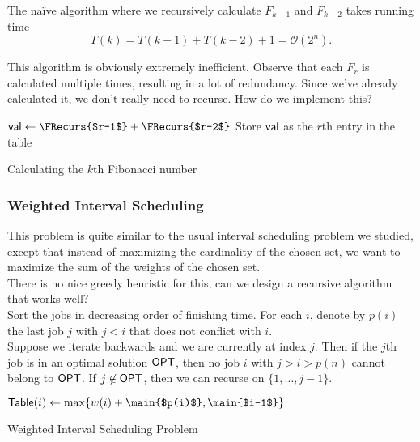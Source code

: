The na\"ive algorithm where we recursively calculate $F_{k-1}$ and $F_{k-2}$ takes running time
\[ T(k) = T(k-1) + T(k-2) + 1 = \mathcal{O}(2^n). \]

This algorithm is obviously extremely inefficient. Observe that each $F_r$ is calculated multiple times, resulting in a lot of redundancy. Since we've already calculated it, we don't really need to recurse. How do we implement this?

\begin{algorithm}[H]
	\DontPrintSemicolon
	 {
		 {
			$\var{val}\gets \FRecurs{$r-1$}+\FRecurs{$r-2$}$\;
			Store $\mathsf{val}$ as the $r$th entry in the table\;
			\;
		}
	}

	\;
	\caption{Calculating the $k$th Fibonacci number}\label{algo: fibo 1}
\end{algorithm}

\subsubsection{Weighted Interval Scheduling}

This problem is quite similar to the usual interval scheduling problem we studied, except that instead of maximizing the cardinality of the chosen set, we want to maximize the sum of the weights of the chosen set.\\
There is no nice greedy heuristic for this, can we design a recursive algorithm that works well?\\

Sort the jobs in decreasing order of finishing time. For each $i$, denote by $p(i)$ the last job $j$ with $j<i$ that does not conflict with $i$.\\
Suppose we iterate backwards and we are currently at index $j$. Then if the $j$th job is in an optimal solution $\mathsf{OPT}$, then no job $i$ with $j>i>p(n)$ cannot belong to $\mathsf{OPT}$. If $j\not\in\mathsf{OPT}$, then we can recurse on $\{1,\ldots,j-1\}$.\\

\begin{algorithm}[H]
	\DontPrintSemicolon
	 {
		 {
			$\var{Table}(i)\gets\max\{w(i)+\main{$p(i)$},\main{$i-1$}\}$\;
		}
	}
	\;
	\caption{Weighted Interval Scheduling Problem}\label{algo: weighted interval sched}
\end{algorithm}


